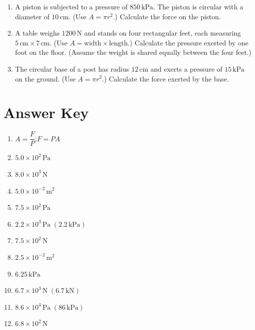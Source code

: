 \documentclass[12pt]{article}
\begin{document}
\begin{enumerate}
\item A piston is subjected to a pressure of \(850\,\text{kPa}\). The piston is circular with a diameter of \(10\,\text{cm}\). (Use \(A = \pi r^{2}\).) Calculate the force on the piston.

\item A table weighs \(1200\,\text{N}\) and stands on four rectangular feet, each measuring \(5\,\text{cm} \times 7\,\text{cm}\). (Use \(A = \text{width} \times \text{length}\).) Calculate the pressure exerted by one foot on the floor. (Assume the weight is shared equally between the four feet.)

\item The circular base of a post has radius \(12\,\text{cm}\) and exerts a pressure of \(15\,\text{kPa}\) on the ground. (Use \(A = \pi r^{2}\).) Calculate the force exerted by the base.
\end{enumerate}

\newpage
\section*{Answer Key}
\begin{enumerate}
\item \(A = \dfrac{F}{P}\);\qquad \(F = P A\)
\item \(5.0\times10^{2}\,\text{Pa}\)
\item \(8.0\times10^{3}\,\text{N}\)
\item \(5.0\times10^{-2}\,\text{m}^2\)
\item \(7.5\times10^{2}\,\text{Pa}\)
\item \(2.2\times10^{3}\,\text{Pa}\;(2.2\,\text{kPa})\)
\item \(7.5\times10^{2}\,\text{N}\)
\item \(2.5\times10^{-2}\,\text{m}^2\)
\item \(6.25\,\text{kPa}\)
\item \(6.7\times10^{3}\,\text{N}\;(6.7\,\text{kN})\)
\item \(8.6\times10^{4}\,\text{Pa}\;(86\,\text{kPa})\)
\item \(6.8\times10^{2}\,\text{N}\)
\end{enumerate}

\newpage
\end{document}
